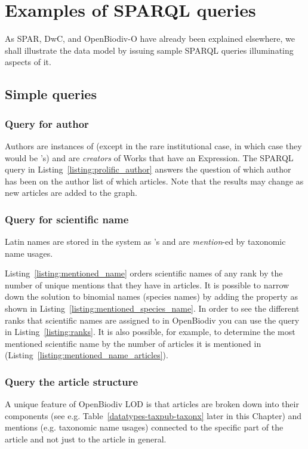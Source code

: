\section{Examples of SPARQL queries}

As SPAR, DwC, and OpenBiodiv-O have already been explained elsewhere, we shall illustrate the data model by issuing sample SPARQL queries illuminating aspects of it.

\subsection{Simple queries}

\subsubsection{Query for author} Authors are instances of  (except in the rare institutional case, in which case they would be 's) and are \emph{creators} of Works that have an Expression. The SPARQL query in Listing~\ref{listing:prolific_author} answers the question of which author has been on the author list of which articles. Note that the results may change as new articles are added to the graph.


\subsubsection{Query for scientific name}

Latin names are stored in the system as 's and are \emph{mention}-ed by taxonomic name usages.

Listing~\ref{listing:mentioned_name} orders scientific names of any rank by the number of unique mentions that they have in articles. It is possible to narrow down the solution to binomial names (species names) by adding the  property as shown in Listing~\ref{listing:mentioned_species_name}. In order to see the different ranks that scientific names are assigned to in OpenBiodiv you can use the query in Listing~\ref{listing:ranks}. It is also possible, for example, to determine the most mentioned scientific name by the number of articles it is mentioned in (Listing~\ref{listing:mentioned_name_articles}).



\subsubsection{Query the article structure} A unique feature of OpenBiodiv LOD is that articles are broken down into their components (see e.g. Table~\ref{datatypes-taxpub-taxonx} later in this Chapter) and mentions (e.g. taxonomic name usages) connected to the specific part of the article and not just to the article in general.

